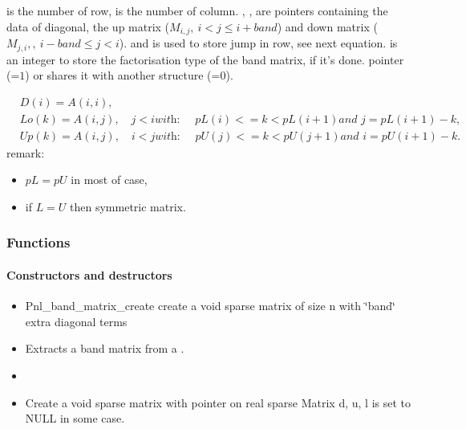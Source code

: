  is the number of row,  is the number of column.
, ,   are pointers containing the
data of diagonal, the up matrix ($M_{i, j}, \ i<j\leq i+band$) and  down
matrix ($M_{j, i}, , \ i-band\leq j<i$).
 and  is used to store jump in row, see next equation.
 is an integer to store the factorisation type of the band
matrix, if it's done.
pointer (=$1$) or shares it with another structure (=$0$).


\begin{align*}
  \label{eq:1}
  & D(i) = A(i, i), \nonumber \\
  & Lo(k) = A(i, j), \quad j < i \textit{with: } \quad pL(i)<= k < pL(i+1)
  \textit{and } j = pL(i+1)-k, \\
  & Up(k) =A(i, j), \quad i < j \textit{with: } \quad pU(j)<= k < pU(j+1) \textit{and } i
  = pU(i+1)-k.\nonumber
\end{align*}
remark:
\begin{itemize}
\item $ pL = pU $ in most of case, 
\item if $L = U$ then symmetric matrix.
\end{itemize}


\subsubsection{Functions}
\paragraph{Constructors and destructors}
\begin{itemize}
\item 
  \sshortdescribe Pnl_band_matrix_create create a void sparse matrix of size n with
  \char`\"{}band\char`\"{} extra diagonal terms
\item
  \sshortdescribe Extracts a band matrix from a .
\item

\item 
  \sshortdescribe Create a void sparse matrix with pointer on real sparse Matrix d, u, l is set
  to NULL in some case.
\end{itemize}
